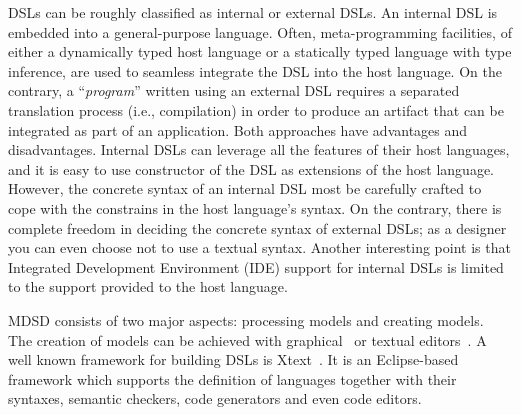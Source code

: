 DSLs can be roughly classified as internal or external DSLs.
An internal DSL is embedded into a general-purpose language.
Often, meta-programming facilities, of either a dynamically typed host language or a statically typed language with type inference, are used to seamless integrate the DSL into the host language.
On the contrary, a ``\textit{program}'' written using an external DSL requires a separated translation process (i.e., compilation) in order to produce an artifact that can be integrated as part of an application.
Both approaches have advantages and disadvantages.
Internal DSLs can leverage all the features of their host languages, and it is easy to use constructor of the DSL as extensions of the host language.
However, the concrete syntax of an internal DSL most be carefully crafted to cope with the constrains in the host language's syntax.
On the contrary, there is complete freedom in deciding the concrete syntax of external DSLs; as a designer you can even choose not to use a textual syntax.
Another interesting point is that Integrated Development Environment (IDE) support for internal DSLs is limited to the support provided to the host language.


MDSD consists of two major aspects: processing models and creating models.
The creation of models can be achieved with graphical~\cite{Kolovos:2009:RLA:1564600.1564699, Biermann:2006:GDI:2087202.2087244} or textual editors~\cite{Merkle:2010:TMT:1869542.1869564}.
A well known framework for building DSLs is Xtext~\cite{Eysholdt:2010:XIY:1869542.1869625}.
It is an Eclipse-based framework which supports the definition of languages together with their syntaxes, semantic checkers, code generators and even code editors.

